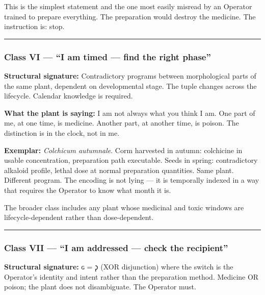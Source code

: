 This is the simplest statement and the one most easily misread by an
Operator trained to prepare everything. The preparation would destroy
the medicine. The instruction is: stop.

\begin{center}\rule{0.5\linewidth}{0.5pt}\end{center}

\hypertarget{class-vi-i-am-timed-find-the-right-phase}{%
\subsubsection{Class VI --- ``I am timed --- find the right
phase''}\label{class-vi-i-am-timed-find-the-right-phase}}

\textbf{Structural signature:} Contradictory programs between
morphological parts of the same plant, dependent on developmental stage.
The tuple changes across the lifecycle. Calendar knowledge is required.

\textbf{What the plant is saying:} I am not always what you think I am.
One part of me, at one time, is medicine. Another part, at another time,
is poison. The distinction is in the clock, not in me.

\textbf{Exemplar:} \emph{Colchicum autumnale}. Corm harvested in autumn:
colchicine in usable concentration, preparation path executable. Seeds
in spring: contradictory alkaloid profile, lethal dose at normal
preparation quantities. Same plant. Different program. The encoding is
not lying --- it is temporally indexed in a way that requires the
Operator to know what month it is.

The broader class includes any plant whose medicinal and toxic windows
are lifecycle-dependent rather than dose-dependent.

\begin{center}\rule{0.5\linewidth}{0.5pt}\end{center}

\hypertarget{class-vii-i-am-addressed-check-the-recipient}{%
\subsubsection{Class VII --- ``I am addressed --- check the
recipient''}\label{class-vii-i-am-addressed-check-the-recipient}}

\textbf{Structural signature:} ɢ = 𐑜 (XOR disjunction) where the switch
is the Operator's identity and intent rather than the preparation
method. Medicine OR poison; the plant does not disambiguate. The
Operator must.

